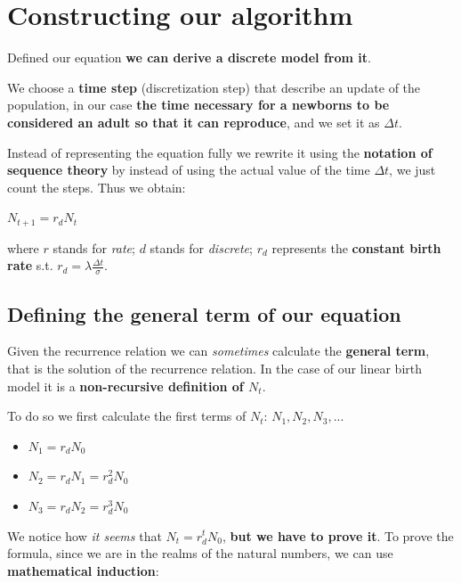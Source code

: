 \section{Constructing our algorithm}
Defined our equation \textbf{we can derive a discrete model from it}.
\par We choose a \textbf{time step} (discretization step) that describe an update of the population, in our case \textbf{the time necessary for a newborns to be considered an adult so that it can reproduce}, and we set it as $\Delta{t}$.
\par Instead of representing the equation fully we rewrite it using the \textbf{notation of sequence theory} by instead of using the actual value of the time $\Delta{t}$, we just count the steps. Thus we obtain:
\begin{center}
    $N_{t+1} = r_{d}N_{t}$
\end{center}
where $r$ stands for \textit{rate}; $d$ stands for \textit{discrete}; $r_{d}$ represents the \textbf{constant birth rate} s.t. $r_{d} = \lambda{\frac{\Delta{t}} {\sigma}}$.

\subsection{Defining the general term of our equation}
Given the recurrence relation we can \textit{sometimes} calculate the \textbf{general term}, that is the solution of the recurrence relation. In the case of our linear birth model it is a \textbf{non-recursive definition of $N_{t}$}.
\par To do so we first calculate the first terms of $N_{t}$: $N_{1}, N_{2}, N_{3}, ...$

\begin{center}
    \begin{itemize}[label={}]
        \item $N_{1} = r_{d}N_{0}$

        \item $N_{2} = r_{d}N_{1} = r^{2}_{d}N_{0}$

        \item $N_{3} = r_{d}N_{2} = r^{3}_{d}N_{0}$
    \end{itemize}
\end{center}

We notice how \textit{it seems} that $N_t = r^{t}_{d}N_{0}$, \textbf{but we have to prove it}.
To prove the formula, since we are in the realms of the natural numbers, we can use \textbf{mathematical induction}:

